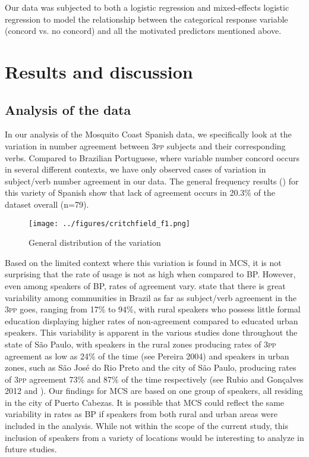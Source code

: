\documentclass[output=paper,colorlinks,citecolor=brown,
]{langscibook}
\begin{document}
Our data was subjected to both a logistic regression and mixed-effects logistic regression to model the relationship between the categorical response variable (concord vs. no concord) and all the motivated predictors mentioned above. 

\section{Results and discussion}

\subsection{Analysis of the data}

In our analysis of the Mosquito Coast Spanish data, we specifically look at the variation in number agreement between \textsc{3pp} subjects and their corresponding verbs. Compared to Brazilian Portuguese, where variable number concord occurs in several different contexts, we have only observed cases of variation in subject/verb number agreement in our data. The general frequency results () for this variety of Spanish show that lack of agreement occurs in 20.3\% of the dataset overall (n=79).

\begin{figure}
    
    \texttt{[image: ../figures/critchfield\_f1.png]}
    \caption{General distribution of the variation}
    \label{fig:critchfield:1}
\end{figure}

Based on the limited context where this variation is found in MCS, it is not surprising that the rate of usage is not as high when compared to BP. However, even among speakers of BP, rates of agreement vary. \citet[362]{mendes2015variable} state that there is great variability among communities in Brazil as far as subject/verb agreement in the \textsc{3pp} goes, ranging from 17\% to 94\%, with rural speakers who possess little formal education displaying higher rates of non-agreement compared to educated urban speakers. This variability is apparent in the various studies done throughout the state of São Paulo, with speakers in the rural zones producing rates of \textsc{3pp} agreement as low as 24\% of the time (see Pereira 2004) and speakers in urban zones, such as São José do Rio Preto and the city of São Paulo, producing rates of \textsc{3pp} agreement 73\%  and 87\% of the time respectively (see Rubio and Gonçalves 2012 and \citealt{oushiro2015identidade}). Our findings for MCS are based on one group of speakers, all residing in the city of Puerto Cabezas. It is possible that MCS could reflect the same variability in rates as BP if speakers from both rural and urban areas were included in the analysis. While not within the scope of the current study, this inclusion of speakers from a variety of locations would be interesting to analyze in future studies.
\end{document}
